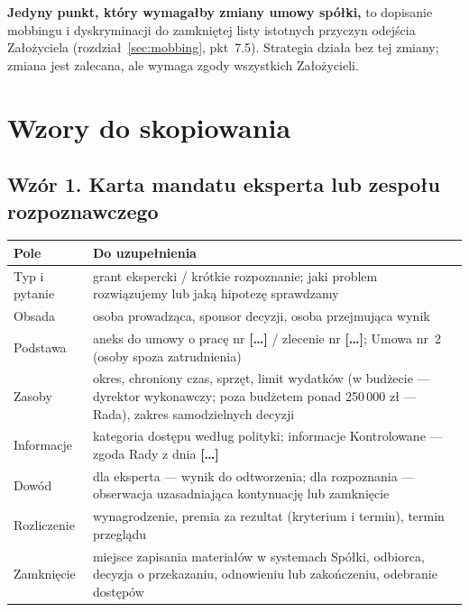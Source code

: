 \documentclass[11pt,a4paper]{report}
\newcommand{\field}[1]{\textbf{[#1]}}
\begin{document}
\textbf{Jedyny punkt, który wymagałby zmiany umowy spółki,} to dopisanie mobbingu i dyskryminacji do zamkniętej listy istotnych przyczyn odejścia Założyciela (rozdział~\ref{sec:mobbing}, pkt~7.5). Strategia działa bez tej zmiany; zmiana jest zalecana, ale wymaga zgody wszystkich Założycieli.

\section{Wzory do skopiowania}

\subsection*{Wzór 1. Karta mandatu eksperta lub zespołu rozpoznawczego}
\begin{tabularx}{\linewidth}{@{}>{\raggedright\arraybackslash}p{3.4cm} X@{}}
\toprule
\textbf{Pole} & \textbf{Do uzupełnienia} \\
\midrule
Typ i pytanie & grant ekspercki / krótkie rozpoznanie; jaki problem rozwiązujemy lub jaką hipotezę sprawdzamy \\
Obsada & osoba prowadząca, sponsor decyzji, osoba przejmująca wynik \\
Podstawa & aneks do umowy o pracę nr \field{\ldots} / zlecenie nr \field{\ldots}; Umowa nr~2 (osoby spoza zatrudnienia) \\
Zasoby & okres, chroniony czas, sprzęt, limit wydatków (w budżecie --- dyrektor wykonawczy; poza budżetem ponad 250\,000 zł --- Rada), zakres samodzielnych decyzji \\
Informacje & kategoria dostępu według polityki; informacje Kontrolowane --- zgoda Rady z dnia \field{\ldots} \\
Dowód & dla eksperta --- wynik do odtworzenia; dla rozpoznania --- obserwacja uzasadniająca kontynuację lub zamknięcie \\
Rozliczenie & wynagrodzenie, premia za rezultat (kryterium i termin), termin przeglądu \\
Zamknięcie & miejsce zapisania materiałów w systemach Spółki, odbiorca, decyzja o przekazaniu, odnowieniu lub zakończeniu, odebranie dostępów \\
\bottomrule
\end{tabularx}
\end{document}
